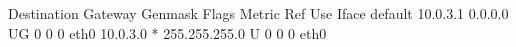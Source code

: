 Destination     Gateway         Genmask         Flags Metric Ref    Use Iface
default         10.0.3.1        0.0.0.0         UG    0      0        0 eth0
10.0.3.0        *               255.255.255.0   U     0      0        0 eth0
